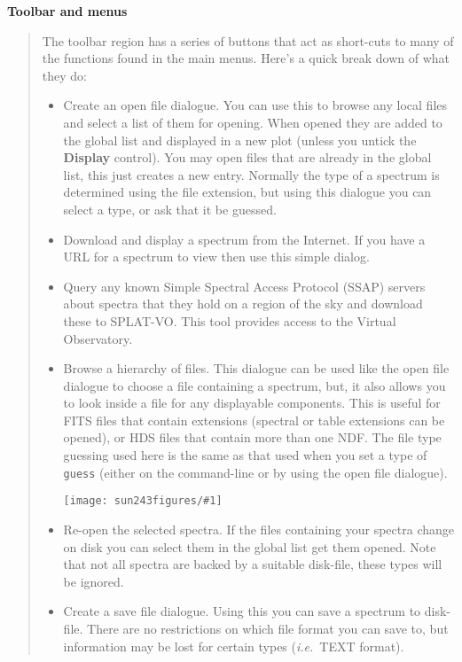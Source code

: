 \documentclass[twoside,11pt]{article}
\newcommand{\htmladdimg}[1]{}
\newcommand{\latexhtml}[2]{#1}
\renewcommand{\_}{\texttt{\symbol{95}}}
\newcommand{\SPLAT}{\textsf{SPLAT-VO}}
\newcommand{\clippedmainfigure}[1]
{\begin{center}
 \latexhtml{\texttt{[image: sun243\_figures/\#1]}}{\htmladdimg{#1.gif}}
 \end{center}
}
\newcommand{\inline}[1]
        {\latexhtml{\texttt{[image: sun243\_figures/\#1]}}
        {\htmladdimg[align=center]{#1.gif}}}
\newcommand{\labelitem}[1]{\textbf{#1}}
\newcommand{\hitext}[1]{\texttt{#1}}
\newcommand{\ie}{\textit{i.e.}}
\newcommand{\subheading}[1]{\textbf{\large{#1}}}
\begin{document}
\subheading{Toolbar and menus}
\begin{quote}
 The toolbar region has a series of buttons that act as short-cuts to
 many of the functions found in the main menus. Here's a quick break
 down of what they do:
 \begin{itemize}

  \item[\inline{openfile}] Create an open file dialogue. You can use this
  to browse any local files and select a list of them for opening. When
  opened they are added to the global list and displayed in a new plot
  (unless you untick the \labelitem{Display} control). You may open files
  that are already in the global list, this just creates a new entry.
  Normally the type of a spectrum is determined using the file extension,
  but using this dialogue you can select a type, or ask that it be guessed.

  \item[\inline{location}] Download and display a spectrum from the Internet.
  If you have a URL for a spectrum to view then use this simple dialog.

  \item[\inline{ssap}] Query any known Simple Spectral Access Protocol (SSAP)
  servers about spectra that they hold on a region of the sky and download
  these to \SPLAT. This tool provides access to the Virtual Observatory.

  \item[\inline{browse}] Browse a hierarchy of files. This dialogue can be used
  like the open file dialogue to choose a file containing a spectrum, but,
  it also allows you to look inside a file for any displayable components.
  This is useful for FITS files that contain extensions (spectral or table
  extensions can be opened), or HDS files that contain more than one NDF.
  The file type guessing used here is the same as that used when you set
  a type of \hitext{guess} (either on the command-line or by using the
  open file dialogue).

  \clippedmainfigure{treeview}

  \item[\inline{reopen}] Re-open the selected spectra. If the files containing
  your spectra change on disk you can select them in the global list get them
  opened. Note that not all spectra are backed by a suitable disk-file, these
  types will be ignored.

  \item[\inline{savefile}] Create a save file dialogue. Using this you can
  save a spectrum to disk-file. There are no restrictions on which file
  format you can save to, but information may be lost for certain types
  (\ie\ TEXT format).


\end{itemize}
\end{quote}
\end{document}
